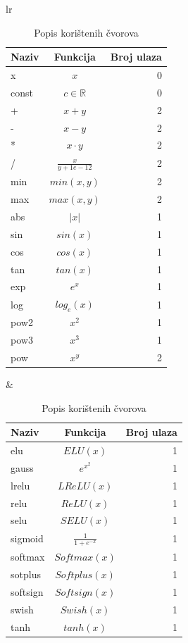 \documentclass[times, utf8, diplomski]{fer}
\def\realnum{\mathbb{R}}
\begin{document}
\begin{table}
\begin{tabular}[t]{lr}
\begin{tabular}[t]{l|c|r}
\textbf{Naziv} & \textbf{Funkcija} & \textbf{Broj ulaza} \\
\hline
x		& $x$					& 0 \\
const	& $c \in \realnum$		& 0 \\
\hline
+		& $x + y$				& 2 \\
-		& $x - y$				& 2 \\
*		& $x \cdot y$			& 2 \\
/		& $\frac{x}{y + 1e-12}$	& 2 \\
\hline
min		& $min(x, y)$			& 2 \\
max		& $max(x, y)$			& 2 \\
abs		& $|x|$					& 1 \\
\hline
sin		& $sin(x)$				& 1 \\
cos		& $cos(x)$				& 1 \\
tan		& $tan(x)$				& 1 \\
\hline
exp		& $e^x$					& 1 \\
log		& $log_e(x)$				& 1 \\
pow2		& $x^2$					& 1 \\
pow3		& $x^3$					& 1 \\
pow		& $x^y$					& 2 \\
\end{tabular}
& \quad
\begin{tabular}[t]{l|c|r}
\textbf{Naziv} & \textbf{Funkcija} & \textbf{Broj ulaza} \\
\hline
elu		& $ELU(x)$				& 1 \\
gauss	& $e^{x^2}$				& 1 \\
lrelu	& $LReLU(x)$				& 1 \\
relu		& $ReLU(x)$				& 1 \\
selu		& $SELU(x)$				& 1 \\
sigmoid	& $\frac{1}{1+e^{-x}}$	& 1 \\
softmax	& $Softmax(x)$			& 1 \\
sotplus	& $Softplus(x)$			& 1 \\
softsign	& $Softsign(x)$			& 1 \\
swish	& $Swish(x)$				& 1 \\
tanh		& $tanh(x)$				& 1 \\
\end{tabular}
\end{tabular}
\caption{Popis korištenih čvorova}
\end{table}
\end{document}

